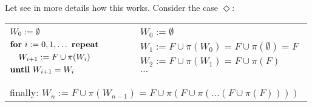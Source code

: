 \documentclass[table]{beamer}
\begin{document}
\begin{frame}
	Let see in more details how this works. Consider the case $\Diamond$:
	\begin{table}[]
		\begin{tabular}{lll}
		$\begin{aligned}
			&W_0 := \emptyset \\
			&\textrm{\textbf{for} } i:=0,1,\ldots \textrm{ \textbf{repeat}} \\
			& \quad W_{i+1} := F \cup \pi(W_i) \\
			&\textrm{\textbf{until} } W_{i+1} = W_i\\
		\end{aligned}$
		& $\quad$ &
		$\begin{aligned}
			&W_0 := \emptyset \\
			&W_1 := F \cup \pi(W_0) = F \cup \pi(\emptyset) = F \\
			&W_2 := F \cup \pi(W_1) = F \cup \pi(F)\\
			& \ldots \\
		\end{aligned}$ \\
		&&\\%
		\multicolumn{3}{l}{finally: $W_n := F \cup \pi(W_{n-1}) = F \cup \pi(F \cup \pi(\ldots(F \cup \pi(F))))$}
		\end{tabular}
	\end{table}

\end{frame}
\end{document}
